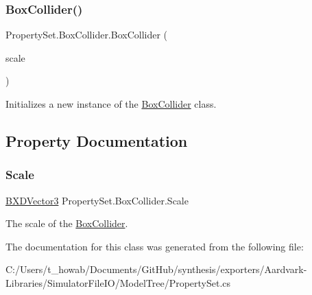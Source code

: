 \subsubsection{\texorpdfstring{Box\+Collider()}{BoxCollider()}}
{\footnotesize\ttfamily Property\+Set.\+Box\+Collider.\+Box\+Collider (\begin{DoxyParamCaption}\item[{\hyperlink{class_b_x_d_vector3}{B\+X\+D\+Vector3}}]{scale }\end{DoxyParamCaption})}



Initializes a new instance of the \hyperlink{class_property_set_1_1_box_collider}{Box\+Collider} class. 



\subsection{Property Documentation}
\mbox{\label{class_property_set_1_1_box_collider_aa77e5fea4e959ffde2763e74383ac70f}} 
\subsubsection{\texorpdfstring{Scale}{Scale}}
{\footnotesize\ttfamily \hyperlink{class_b_x_d_vector3}{B\+X\+D\+Vector3} Property\+Set.\+Box\+Collider.\+Scale\hspace{0.3cm}{\ttfamily [get]}}



The scale of the \hyperlink{class_property_set_1_1_box_collider}{Box\+Collider}. 



The documentation for this class was generated from the following file\+:\begin{DoxyCompactItemize}
\item 
C\+:/\+Users/t\+\_\+howab/\+Documents/\+Git\+Hub/synthesis/exporters/\+Aardvark-\/\+Libraries/\+Simulator\+File\+I\+O/\+Model\+Tree/Property\+Set.\+cs\end{DoxyCompactItemize}
